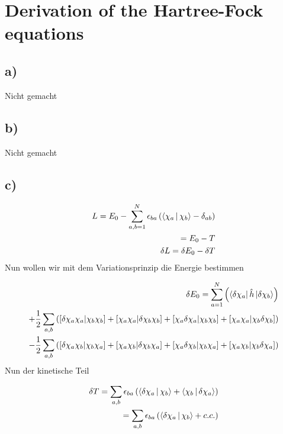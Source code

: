 \section{Derivation of the Hartree-Fock equations}

\subsection{a)}
Nicht gemacht

\subsection{b)}
Nicht gemacht

\subsection{c)}

\begin{align}
L = E_0 - \sum_{a,b = 1}^N \epsilon_{ba} \left( \Braket{\chi_a|\chi_b} - \delta_{ab} \right) \\
= E_0 - T \\
\delta L = \delta E_0 - \delta T \\
\end{align}
Nun wollen wir mit dem Variationsprinzip die Energie bestimmen

\begin{align}
\delta E_0 = \sum_{a=1}^N \left( \Bra{\delta \chi_a} \hat{h} \Ket{\delta \chi_b} \right) \\
+ \frac{1}{2} \sum_{a,b} \left( \left[\delta \chi_a \chi_a | \chi_b \chi_b \right] + \left[\chi_a \chi_a | \delta \chi_b \chi_b \right] + \left[\chi_a \delta \chi_a | \chi_b \chi_b \right] + \left[\chi_a \chi_a | \chi_b \delta \chi_b \right] \right) \\
- \frac{1}{2} \sum_{a,b} \left( \left[\delta \chi_a \chi_b | \chi_b \chi_a \right] + \left[\chi_a \chi_b | \delta \chi_b \chi_a \right] + \left[\chi_a \delta \chi_b | \chi_b \chi_a \right] + \left[\chi_a \chi_b | \chi_b \delta \chi_a \right] \right)
\end{align}
Nun der kinetische Teil

\begin{align}
\delta T = \sum_{a,b} \epsilon_{ba} \left( \Braket{\delta \chi_a|\chi_b} + \Braket{\chi_b|\delta \chi_a} \right) \\
= \sum_{a,b} \epsilon_{ba} \left( \Braket{\delta \chi_a|\chi_b} + c.c. \right)
\end{align}

